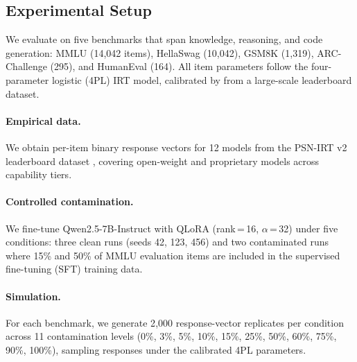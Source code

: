 \subsection{Experimental Setup}
\label{sec:setup}

We evaluate on five benchmarks that span knowledge, reasoning, and code generation: MMLU \citep{hendrycks2021mmlu} (14,042 items), HellaSwag (10,042), GSM8K (1,319), ARC-Challenge (295), and HumanEval (164).
All item parameters follow the four-parameter logistic (4PL) IRT model, calibrated by \citet{psnirt2026} from a large-scale leaderboard dataset.

\paragraph{Empirical data.}
We obtain per-item binary response vectors for 12 models from the PSN-IRT v2 leaderboard dataset \citep{psnirt2026}, covering open-weight and proprietary models across capability tiers.

\paragraph{Controlled contamination.}
We fine-tune Qwen2.5-7B-Instruct with QLoRA (rank\,=\,16, $\alpha$\,=\,32) under five conditions: three clean runs (seeds 42, 123, 456) and two contaminated runs where 15\% and 50\% of MMLU evaluation items are included in the supervised fine-tuning (SFT) training data.

\paragraph{Simulation.}
For each benchmark, we generate 2{,}000 response-vector replicates per condition across 11 contamination levels (0\%, 3\%, 5\%, 10\%, 15\%, 25\%, 50\%, 60\%, 75\%, 90\%, 100\%), sampling responses under the calibrated 4PL parameters.